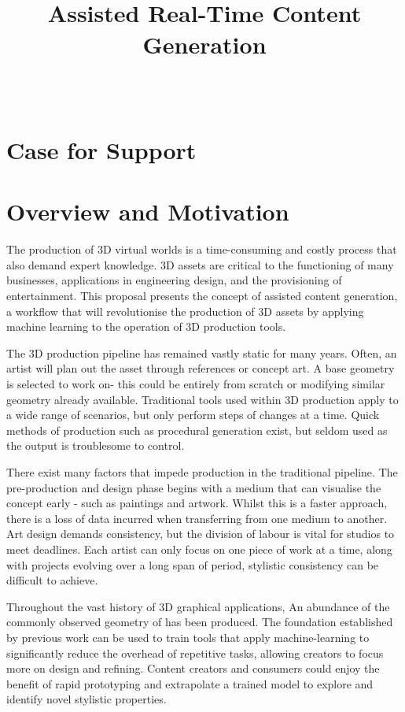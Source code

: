 \documentclass[a4paper, fontsize=15pt, onecolumn]{article} %
\title{
	\vspace{-3.0cm}
	\horrule{0.4pt} \\[0.2cm] %
	\vspace{0.2cm}
	\Large Assisted Real-Time Content Generation\\
	\horrule{0.4pt} \\[0cm] %
	\vspace{-0.5cm}
}
\date{} %
\numberwithin{equation}{section} %
\numberwithin{figure}{section} %
\numberwithin{table}{section} %
\begin{document}
\maketitle
\thispagestyle{fancy} %

\section*{Case for Support}
\section{Overview and Motivation}
The production of 3D virtual worlds is a time-consuming and costly process that also demand expert knowledge. 3D assets are critical to the functioning of many businesses, applications in engineering design, and the provisioning of entertainment. This proposal presents the concept of assisted content generation, a workflow that will revolutionise the production of 3D assets by applying machine learning to the operation of 3D production tools.

The 3D production pipeline has remained vastly static for many years. Often, an artist will plan out the asset through references or concept art. A base geometry is selected to work on- this could be entirely from scratch or modifying similar geometry already available. Traditional tools used within 3D production apply to a wide range of scenarios, but only perform steps of changes at a time. 
Quick methods of production such as procedural generation exist, but seldom used as the output is troublesome to control.

There exist many factors that impede production in the traditional pipeline. The pre-production and design phase begins with a medium that can visualise the concept early - such as paintings and artwork. Whilst this is a faster approach, there is a loss of data incurred when transferring from one medium to another. Art design demands consistency, but the division of labour is vital for studios to meet deadlines. Each artist can only focus on one piece of work at a time, along with projects evolving over a long span of period, stylistic consistency can be difficult to achieve. 

Throughout the vast history of 3D graphical applications, An abundance of the commonly observed geometry of has been produced. The foundation established by previous work can be used to train tools that apply machine-learning to significantly reduce the overhead of repetitive tasks, allowing creators to focus more on design and refining. Content creators and consumers could enjoy the benefit of rapid prototyping and extrapolate a trained model to explore and identify novel stylistic properties.
\end{document}
